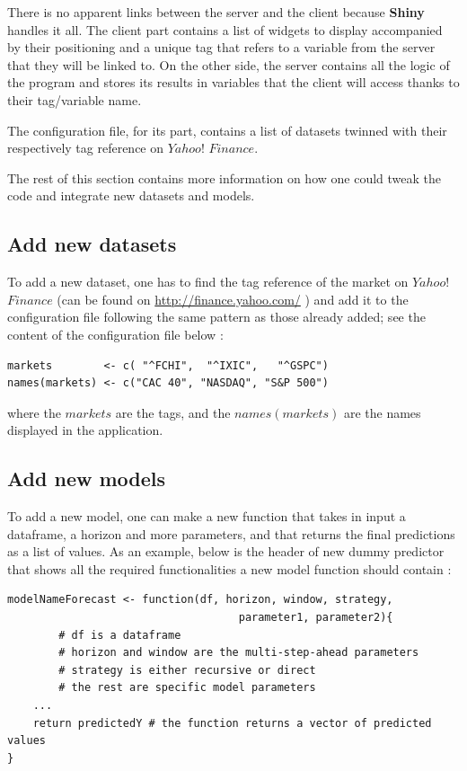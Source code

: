 \documentclass[11pt,a4paper,oneside]{book}
\begin{document}
There is no apparent links between the server and the client because \textbf{Shiny} handles it all. The client part contains a list of widgets to display accompanied by their positioning and a unique tag that refers to a variable from the server that they will be linked to. On the other side, the server contains all the logic of the program and stores its results in variables that the client will access thanks to their tag/variable name.

The configuration file, for its part, contains a list of datasets twinned with their respectively tag reference on $Yahoo!$ $Finance$. 

The rest of this section contains more information on how one could tweak the code and integrate new datasets and models.


\subsection{Add new datasets}

To add a new dataset, one has to find the tag reference of the market on $Yahoo!$ $Finance$ (can be found on \url{http://finance.yahoo.com/} \cite{yahoo}) and add it to the configuration file following the same pattern as those already added; see the content of the configuration file below : 


\begin{lstlisting}
markets        <- c( "^FCHI",  "^IXIC",   "^GSPC")
names(markets) <- c("CAC 40", "NASDAQ", "S&P 500")
\end{lstlisting}

where the $markets$ are the tags, and the $names(markets)$ are the names displayed in the application.


\subsection{Add new models}

To add a new model, one can make a new function that takes in input a dataframe, a horizon and more parameters, and that returns the final predictions as a list of values. As an example, below is the header of new dummy predictor that shows all the required functionalities a new model function should contain : \\


\begin{lstlisting}
modelNameForecast <- function(df, horizon, window, strategy, 
                                    parameter1, parameter2){
        # df is a dataframe
        # horizon and window are the multi-step-ahead parameters
        # strategy is either recursive or direct
        # the rest are specific model parameters
    ...
    return predictedY # the function returns a vector of predicted values
}
\end{lstlisting}
\end{document}

